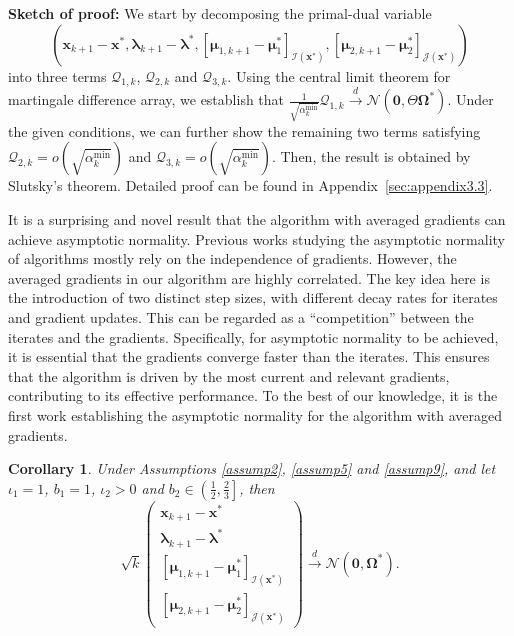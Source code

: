 \documentclass[aos]{imsart}
\numberwithin{equation}{section}
\theoremstyle{plain}
\newtheorem{corollary}{Corollary}
\begin{document}
\textbf{Sketch of proof:} 
We start by decomposing the primal-dual variable 
$$(\bm{x}_{k+1} - \bm{x}^{*}, \bm{\lambda}_{k+1} - \bm{\lambda}^{*}, \left[ \bm{\mu}_{1,k+1} - \bm{\mu}_{1}^{*}\right]_{\mathcal{I}(\bm{x}^{*})}, \left[ \bm{\mu}_{2,k+1} - \bm{\mu}_{2}^{*} \right]_{\mathcal{J}(\bm{x}^{*})})$$ 
into three terms $\mathcal{Q}_{1,k}$, $\mathcal{Q}_{2,k}$ and $\mathcal{Q}_{3,k}$. 
Using the central limit theorem for martingale difference array, we establish that $\frac{1}{\sqrt{\alpha_k^{\text{min}}}} \mathcal{Q}_{1,k} \stackrel{d}{\longrightarrow} \mathcal{N} \left( \bm{0}, \Theta \bm{\Omega}^{*} \right)$. 
Under the given conditions, we can further show the remaining two terms satisfying $\mathcal{Q}_{2,k} = o\left( \sqrt{\alpha_k^{\text{min}}}\right)$ and $\mathcal{Q}_{3,k} = o\left( \sqrt{\alpha_k^{\text{min}}}\right)$. 
Then, the result is obtained by Slutsky's theorem. 
Detailed proof can be found in Appendix~\ref{sec:appendix3.3}.


It is a surprising and novel result that the algorithm with averaged gradients can achieve asymptotic normality. 
Previous works \cite{na2022asymptotic, chen2020statistical, leluc2020asymptotic, toulis2017asymptotic} studying the asymptotic normality of algorithms mostly rely on the independence of gradients.
However, the averaged gradients in our algorithm are highly correlated. 
The key idea here is the introduction of two distinct step sizes, with different decay rates for iterates and gradient updates. 
This can be regarded as a ``competition'' between the iterates and the gradients. 
Specifically, for asymptotic normality to be achieved, it is essential that the gradients converge faster than the iterates. 
This ensures that the algorithm is driven by the most current and relevant gradients, contributing to its effective performance.
To the best of our knowledge, it is the first work establishing the asymptotic normality for the algorithm with averaged gradients. 

    


\begin{corollary}
\label{coro_optimality}
     Under Assumptions \ref{assump2}, \ref{assump5} and \ref{assump9}, and let $\iota_1 = 1$, $b_1 = 1$, $\iota_2 > 0$ and $b_2 \in \left( \frac{1}{2}, \frac{2}{3} \right]$, then 
    \begin{equation}
    \label{optimal_asymptotic_normality}
        \sqrt{k} \left( \begin{array}{c}
    \bm{x}_{k+1} - \bm{x}^{*}  \\
    \bm{\lambda}_{k+1} - \bm{\lambda}^{*} \\
    \left[ \bm{\mu}_{1,k+1} - \bm{\mu}_{1}^{*}\right]_{\mathcal{I}(\bm{x}^{*})} \\
    \left[ \bm{\mu}_{2,k+1} - \bm{\mu}_{2}^{*} \right]_{\mathcal{J}(\bm{x}^{*})} 
    \end{array} \right) \stackrel{d}{\longrightarrow} \mathcal{N} \left( \bm{0}, \bm{\Omega}^{*} \right).
    \end{equation}
\end{corollary}
\end{document}
